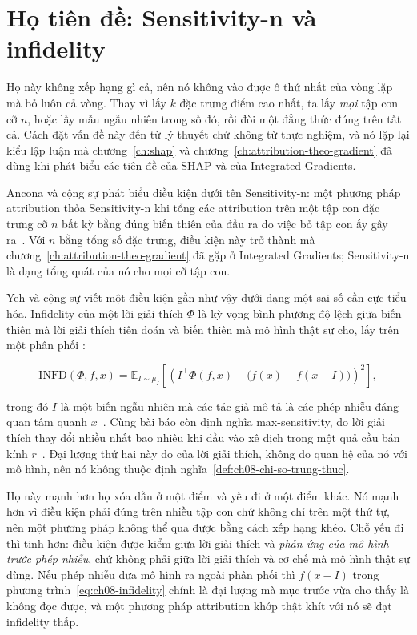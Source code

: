 \section{Họ tiên đề: Sensitivity-n và infidelity}
\label{sec:ch08-ho-tien-de}

%
%
Họ này không xếp hạng gì cả, nên nó không vào được ô thứ nhất của vòng lặp mà
bỏ luôn cả vòng. Thay vì lấy $k$ đặc trưng
điểm cao nhất, ta lấy \emph{mọi} tập con cỡ $n$, hoặc lấy mẫu ngẫu nhiên trong
số đó, rồi đòi một đẳng thức đúng trên tất cả. Cách đặt vấn đề này đến từ lý
thuyết chứ không từ thực nghiệm, và nó lặp lại kiểu lập luận mà
chương~\ref{ch:shap} và chương~\ref{ch:attribution-theo-gradient} đã dùng khi
phát biểu các tiên đề của SHAP và của Integrated Gradients.

Ancona và cộng sự phát biểu điều kiện dưới tên Sensitivity-n: một phương pháp
attribution thỏa Sensitivity-n khi tổng các attribution trên một tập con đặc
trưng cỡ $n$ bất kỳ bằng đúng biến thiên của đầu ra do việc bỏ tập con ấy gây
ra~\autocite{msensn}. Với $n$ bằng tổng số đặc trưng, điều kiện này trở thành
 mà chương~\ref{ch:attribution-theo-gradient} đã
gặp ở Integrated Gradients; Sensitivity-n là dạng tổng quát của nó cho mọi cỡ tập con.

Yeh và cộng sự viết một điều kiện gần như vậy dưới dạng một sai số cần cực
tiểu hóa. Infidelity của một lời giải thích $\Phi$ là kỳ vọng bình phương độ
lệch giữa biến thiên mà lời giải thích tiên đoán và biến thiên mà mô hình thật
sự cho, lấy trên một phân phối :

\begin{equation}
\label{eq:ch08-infidelity}
\mathrm{INFD}(\Phi, f, x)
= \mathbb{E}_{I \sim \mu_I}
  \left[
    \left(
      I^{\top}\Phi(f,x) - \bigl(f(x) - f(x - I)\bigr)
    \right)^{2}
  \right],
\end{equation}

trong đó $I$ là một biến ngẫu nhiên mà các tác giả mô tả là các phép nhiễu đáng
quan tâm quanh $x$~\autocite{minfid}. Cùng bài báo còn định nghĩa max-sensitivity,
đo lời giải thích thay đổi nhiều nhất bao nhiêu khi đầu vào xê dịch trong một
quả cầu bán kính $r$~\autocite{minfid}. Đại lượng thứ hai này đo
của lời giải thích, không đo quan hệ của nó với mô hình, nên nó không thuộc
định nghĩa~\ref{def:ch08-chi-so-trung-thuc}.

Họ này mạnh hơn họ xóa dần ở một điểm và yếu đi ở một điểm khác. Nó mạnh hơn vì
điều kiện phải đúng trên nhiều tập con chứ không chỉ trên một thứ tự, nên một
phương pháp không thể qua được bằng cách xếp hạng khéo. Chỗ yếu đi thì tinh hơn: điều kiện được
kiểm giữa lời giải thích và \emph{phản ứng của mô hình trước phép nhiễu}, chứ
không phải giữa lời giải thích và cơ chế mà mô hình thật sự dùng. Nếu phép nhiễu đưa mô hình ra
ngoài phân phối thì $f(x - I)$ trong phương trình~\ref{eq:ch08-infidelity} chính
là đại lượng mà mục trước vừa cho thấy là không đọc được, và một phương pháp
attribution khớp thật khít với nó sẽ đạt infidelity thấp.


